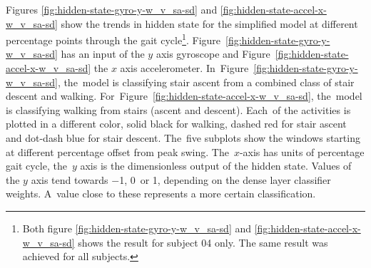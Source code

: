 Figures \ref{fig:hidden-state-gyro-y-w_v_sa-sd} and \ref{fig:hidden-state-accel-x-w_v_sa-sd} show the trends in hidden state for the simplified model at different percentage points through the gait cycle\footnote{Both figure \ref{fig:hidden-state-gyro-y-w_v_sa-sd}  and \ref{fig:hidden-state-accel-x-w_v_sa-sd} shows the result for subject 04 only. The same result was achieved for all subjects.}. Figure~\ref{fig:hidden-state-gyro-y-w_v_sa-sd} has an input of the $y$ axis gyroscope and Figure~\ref{fig:hidden-state-accel-x-w_v_sa-sd} the $x$ axis accelerometer. In~Figure~\ref{fig:hidden-state-gyro-y-w_v_sa-sd}, the~model is classifying stair ascent from a combined class of stair descent and walking. For~Figure~\ref{fig:hidden-state-accel-x-w_v_sa-sd}, the~model is classifying walking from stairs (ascent and descent). Each~of the activities is plotted in a different color, solid black for walking, dashed red for stair ascent and dot-dash blue for stair descent. The~five subplots show the windows starting at different percentage offset from peak swing. The~$x$-axis has units of percentage gait cycle, the~$y$ axis is the dimensionless output of the hidden state. Values of the $y$ axis tend towards $-$1, 0~or 1, depending on the dense layer classifier weights. A~value close to these represents a more certain classification.


